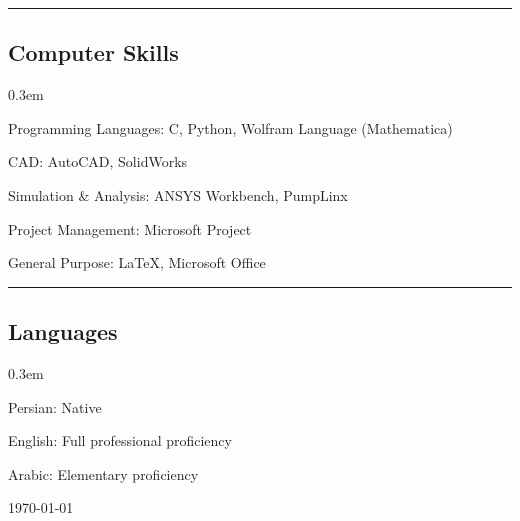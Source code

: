 \documentclass[12pt,a4paper]{article}
\newenvironment{indentsection}[1]%
{\begin{list}{}%
	{\setlength{\leftmargin}{#1}}%
	\item[]%
}
{\end{list}}
\newcommand{\CPP}
{C\nolinebreak[4]\hspace{-.05em}\raisebox{.22ex}{\footnotesize\bf ++}}
\begin{document}
\hrule
\vspace{-0.4em}
\subsection*{Computer Skills}

\begin{indentsection}{\parindent}
\begin{description*}
    \itemsep0.3em
	\item[Programming Languages:]
	\CPP, Python, Wolfram Language (Mathematica)
	\item[CAD:]
	AutoCAD, SolidWorks
	\item[Simulation \& Analysis:]
	ANSYS Workbench, PumpLinx
	\item[Project Management:]
	Microsoft Project
	\item[General Purpose:]
	\LaTeX, Microsoft Office
\end{description*}
\end{indentsection}

\hrule
\vspace{-0.4em}
\subsection*{Languages}

\begin{indentsection}{\parindent}
\begin{description*}
    \itemsep0.3em
	\item[Persian:]
	Native
	\item[English:]
	Full professional proficiency
	\item[Arabic:]
	Elementary proficiency
\end{description*}
\end{indentsection}
\begin{flushright}
    \today
\end{flushright}
\end{document}
